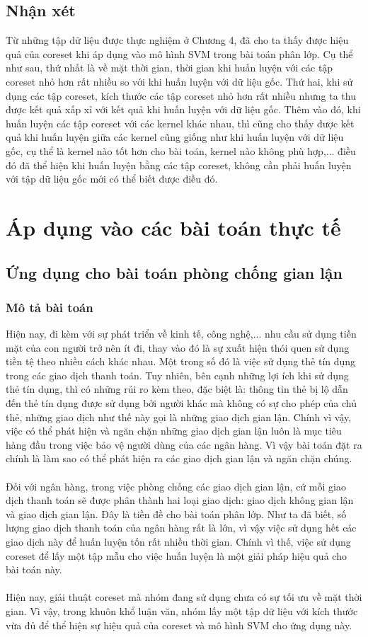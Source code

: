\documentclass[a4paper, 12pt, oneside]{report}
\begin{document}
\section{Nhận xét}
Từ những tập dữ liệu được thực nghiệm ở Chương 4, đã cho ta thấy được hiệu quả của coreset khi áp dụng vào mô hình SVM trong bài toán phân lớp. Cụ thể như sau, thứ nhất là về mặt thời gian, thời gian khi huấn luyện với các tập coreset nhỏ hơn rất nhiều so với khi huấn luyện với dữ liệu gốc. Thứ hai, khi sử dụng các tập coreset, kích thước các tập coreset nhỏ hơn rất nhiều nhưng ta thu được kết quả xấp xỉ với kết quả khi huấn luyện với dữ liệu gốc. Thêm vào đó, khi huấn luyện các tập coreset với các kernel khác nhau, thì cũng cho thấy được kết quả khi huấn luyện giữa các kernel cũng giống như khi huấn luyện với dữ liệu gốc, cụ thể là kernel nào tốt hơn cho bài toán, kernel nào không phù hợp,... điều đó đã thể hiện khi huấn luyện bằng các tập coreset, không cần phải huấn luyện với tập dữ liệu gốc mới có thể biết được điều đó.  
\chapter{Áp dụng vào các bài toán thực tế}
\section{Ứng dụng cho bài toán phòng chống gian lận}
\subsection{Mô tả bài toán}
Hiện nay, đi kèm với sự phát triển về kinh tế, công nghệ,... nhu cầu sử dụng tiền mặt của con người trở nên ít đi, thay vào đó là sự xuất hiện thói quen sử dụng tiền tệ theo nhiều cách khác nhau. Một trong số đó là việc sử dụng thẻ tín dụng trong các giao dịch thanh toán. Tuy nhiên, bên cạnh những lợi ích khi sử dụng thẻ tín dụng, thì có những rủi ro kèm theo, đặc biệt là: thông tin thẻ bị lộ dẫn đến thẻ tín dụng được sử dụng bởi người khác mà không có sự cho phép của chủ thẻ, những giao dịch như thế này gọi là những giao dịch gian lận. Chính vì vậy, việc có thể phát hiện và ngăn chặn những giao dịch gian lận luôn là mục tiêu hàng đầu trong việc bảo vệ người dùng của các ngân hàng. Vì vậy bài toán đặt ra chính là làm sao có thể phát hiện ra các giao dịch gian lận và ngăn chặn chúng. \\ \\ 
Đối với ngân hàng, trong việc phòng chống các giao dịch gian lận, cứ mỗi giao dịch thanh toán sẽ được phân thành hai loại giao dịch: giao dịch không gian lận và giao dịch gian lận. Đây là tiền đề cho bài toán phân lớp. Như ta đã biết, số lượng giao dịch thanh toán của ngân hàng rất là lớn, vì vậy việc sử dụng hết các giao dịch này để huấn luyện tốn rất nhiều thời gian. Chính vì thế, việc sử dụng coreset để lấy một tập mẫu cho việc huấn luyện là một giải pháp hiệu quả cho bài toán này.\\ \\
Hiện nay, giải thuật coreset mà nhóm đang sử dụng chưa có sự tối ưu về mặt thời gian. Vì vậy, trong khuôn khổ luận văn, nhóm lấy một tập dữ liệu với kích thước vừa đủ để thể hiện sự hiệu quả của coreset và mô hình SVM cho ứng dụng này. 
\end{document}
